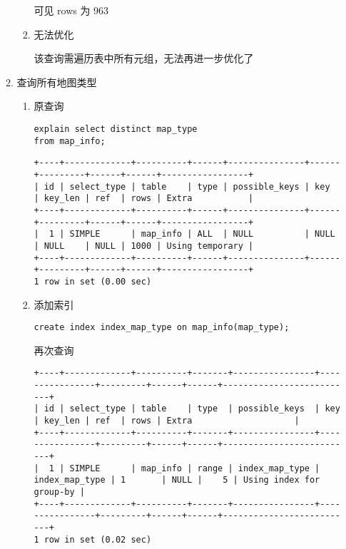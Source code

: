 \documentclass[11pt]{article}
\begin{document}
\begin{itemize}
\begin{enumerate}
\begin{enumerate}
可见 rows 为 963

\item 无法优化

该查询需遍历表中所有元组，无法再进一步优化了
\end{enumerate}

\item 查询所有地图类型
\begin{enumerate}
\item 原查询

\begin{lstlisting}
explain select distinct map_type
from map_info;
\end{lstlisting}

\begin{verbatim}
+----+-------------+----------+------+---------------+------+---------+------+------+-----------------+
| id | select_type | table    | type | possible_keys | key  | key_len | ref  | rows | Extra           |
+----+-------------+----------+------+---------------+------+---------+------+------+-----------------+
|  1 | SIMPLE      | map_info | ALL  | NULL          | NULL | NULL    | NULL | 1000 | Using temporary |
+----+-------------+----------+------+---------------+------+---------+------+------+-----------------+
1 row in set (0.00 sec)
\end{verbatim}

\item 添加索引

\begin{lstlisting}
create index index_map_type on map_info(map_type);
\end{lstlisting}

再次查询

\begin{verbatim}
+----+-------------+----------+-------+----------------+----------------+---------+------+------+--------------------------+
| id | select_type | table    | type  | possible_keys  | key            | key_len | ref  | rows | Extra                    |
+----+-------------+----------+-------+----------------+----------------+---------+------+------+--------------------------+
|  1 | SIMPLE      | map_info | range | index_map_type | index_map_type | 1       | NULL |    5 | Using index for group-by |
+----+-------------+----------+-------+----------------+----------------+---------+------+------+--------------------------+
1 row in set (0.02 sec)
\end{verbatim}


\end{enumerate}
\end{enumerate}
\end{itemize}
\end{document}

